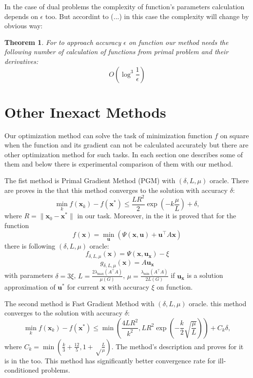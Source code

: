 \documentclass[12pt]{article}
\newtheorem{theorem}{Theorem}[section]
\begin{document}
In the case of dual problems the complexity of function's parameters calculation depends on $\epsilon$ too. But accordint to (...) in this case the complexity will change by obvious way:

\begin{theorem}
For to approach accuracy $\epsilon$ on function our method needs the following number of calculation of functions from primal problem and their derivatives:
$$O(\log^3\frac{1}{\epsilon})$$
\end{theorem} 

\section{Other Inexact Methods}
\label{Inexact}

Our optimization method can solve the task of minimization function $f$ on square when the function and its gradient can not be calculated accurately but there are other optimization method for such tasks. In each section one describes some of them and below there is experimental comparison of them with our method.

The fist method is Primal Gradient Method (PGM) with $(\delta, L,\mu)$ oracle. There are proves in the \cite{PGM} that this method converges to the solution with accuracy $\delta$:
$$\min_k f(\textbf{x}_k) - f(\textbf{x}^*) \leq \frac{LR^2}{2}\exp\left(-k\frac{\mu}{L}\right) + \delta,$$
where $R = \|\textbf{x}_0-\textbf{x}^*\|$ in our task. Moreover, in the \cite{PGM} it is proved that for the function
$$f(\textbf{x}) = \min\limits_\textbf{u} \left(\Psi(\textbf{x},\textbf{u}) + \textbf{u}^\top A\textbf{x}\right)$$
there is following $(\delta, L,\mu)$ oracle:
$$f_{\delta, L,\mu}(\textbf{x}) = \Psi(\textbf{x}, \textbf{u}_\textbf{x}) - \xi$$
$$g_{\delta, L,\mu}(\textbf{x}) = A\textbf{u}_\textbf{x}$$
with parameters $\delta = 3\xi$, $L = \frac{2\lambda_{\max}(A^\top A)}{\mu(G)}$, $\mu = \frac{\lambda_{\min}(A^\top A)}{2L(G)}$ if $\textbf{u}_\textbf{x}$ is a solution approximation of $\textbf{u}^*$ for current $\textbf{x}$ with accuracy $\xi$ on function.

The second method is Fast Gradient Method with $(\delta, L,\mu)$ oracle.
this method converges to the solution with accuracy $\delta$:
$$\min_k f(\textbf{x}_k) - f(\textbf{x}^*) \leq \min\left(\frac{4LR^2}{k^2}, LR^2\exp\left(-\frac{k}{2}\sqrt{\frac{\mu}{L}}\right)\right) + C_k\delta,$$
where $C_k = \min\left(\frac{k}{3}+\frac{12}{5}, 1+\sqrt\frac{L}{\mu}\right)$. The method's description and proves for it is in the \cite{PGM} too. This method has significantly better convergence rate for  ill-conditioned problems.
\end{document}
